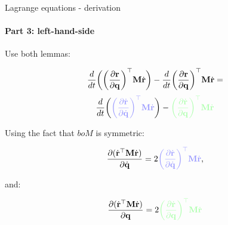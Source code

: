 \documentclass{beamer}
\begin{document}
\begin{frame}{Lagrange equations - derivation}
\framesubtitle{Part 3: left-hand-side}
\begin{flushleft}

Use both lemmas:

\[
    \frac{d}{dt} \bigg(\bigg( \frac{\partial \mathbf{r}}{\partial \mathbf{q}} \bigg) ^\top
    \mathbf{M} \dot{\mathbf{r}} \bigg) - 
    \frac{d}{dt} \bigg( \frac{\partial \mathbf{r}}{\partial \mathbf{q}} \bigg) ^\top
    \mathbf{M} \dot{\mathbf{r}} =
\]
\[
    \frac{d}{dt} \bigg( 
    \textcolor{myblue}{ \bigg( \frac{\partial \dot{\bo{r}}}{\partial \dot{\bo{q}}} \bigg) ^\top
    \bo{M} \dot{\bo{r}} }
    \bigg) - 
    \textcolor{mygreen}{\bigg( \frac{\partial \dot{\bo{r}}}{\partial \bo{q}} \bigg) ^\top
    \bo{M} \dot{\bo{r}}}
\]

Using the fact that $bo{M}$ is symmetric:

\[
\frac{\partial (\dot{\bo{r}} ^\top \bo{M} \dot{\bo{r}}) }{\partial \dot{\bo{q}}} = 
2 \textcolor{myblue}{\bigg( \frac{\partial \dot{\bo{r}}  }{\partial \dot{\bo{q}}} \bigg)^\top \bo{M} \dot{\bo{r}}},
\]

and:

\[
\frac{\partial (\dot{\bo{r}}^\top \bo{M} \dot{\bo{r}})}{\partial \bo{q}} = 
2 \textcolor{mygreen}{\bigg( \frac{\partial \dot{\bo{r}} }{\partial \bo{q}} \bigg)^\top 
\bo{M} \dot{\bo{r}}}
\]


\end{flushleft}
\end{frame}
\end{document}
